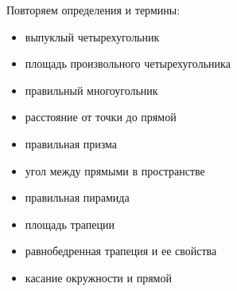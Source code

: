 \documentclass[geometry,a5paper]{pum}
\date{09.04.20}
\begin{document}
Повторяем определения и термины:
\begin{itemize}
  \item выпуклый четырехугольник 
  \item площадь произвольного четырехугольника
  \item правильный многоугольник
  \item расстояние от точки до прямой
  \item правильная призма
  \item угол между прямыми в пространстве
  \item правильная пирамида
  \item площадь трапеции
  \item равнобедренная трапеция и ее свойства
  \item касание окружности и прямой
\end{itemize}
\end{document}
